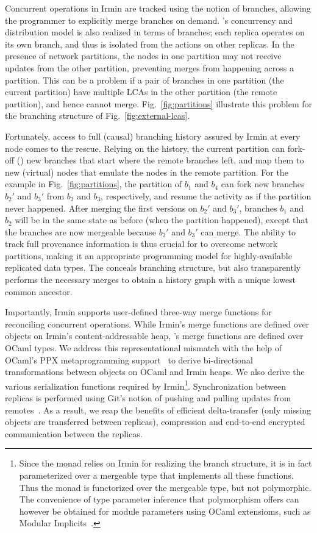 Concurrent operations in Irmin are tracked using the notion of
branches, allowing the programmer to explicitly merge branches on
demand. \name's concurrency and distribution model is also realized in
terms of branches; each replica operates on its own branch, and thus
is isolated from the actions on other replicas. In the presence of
network partitions, the nodes in one partition may not receive updates
from the other partition, preventing merges from happening across a
partition. This can be a problem if a pair of branches in one
partition (the current partition) have multiple LCAs in the other
partition (the remote partition), and hence cannot
merge. Fig.~\ref{fig:partitions} illustrate this problem for the
branching structure of Fig.~\ref{fig:external-lcas}.

Fortunately, access to full (causal) branching history assured by
Irmin at every node comes to the rescue. Relying on the history, the
current partition can fork-off () new branches that start
where the remote branches left, and map them to new (virtual) nodes
that emulate the nodes in the remote partition. For the example in
Fig.~\ref{fig:partitions}, the partition of $b_1$ and $b_4$ can fork
new branches $b_2'$ and $b_3'$ from $b_2$ and $b_3$, respectively, and
resume the activity as if the partition never happened. After merging
the first versions on $b_2'$ and $b_3'$, branches $b_1$ and $b_2$ will
be in the same state as before (when the partition happened), except
that the branches are now mergeable because $b_2'$ and $b_3'$ can
merge. The ability to track full provenance information is thus
crucial for \name to overcome network partitions, making it an
appropriate programming model for highly-available replicated data
types. The \nameMonad conceals branching structure, but also
transparently performs the necessary merges to obtain a history graph
with a unique lowest common ancestor.

Importantly, Irmin supports user-defined three-way merge functions for
reconciling concurrent operations. While Irmin's merge functions are
defined over objects on Irmin's content-addressable heap, \name's
merge functions are defined over OCaml types. We address this
representational mismatch with the help of OCaml's PPX metaprogramming
support~\cite{ppx} to derive bi-directional transformations between
objects on OCaml and Irmin heaps. We also derive the various
serialization functions required by Irmin\footnote{
  Since the \nameMonad monad relies on Irmin for realizing the branch
  structure, it is in fact parameterized over a mergeable type that
  implements all these functions. Thus the monad is functorized over
  the mergeable type, but not polymorphic. The convenience of type
  parameter inference that polymorphism offers can however be obtained
  for module parameters using OCaml extensioms, such as Modular
  Implicits~\cite{implicits}.
}.
Synchronization between replicas is performed using Git's notion of
pushing and pulling updates from remotes~\cite{git-tp}. As a result, we reap the
benefits of efficient delta-transfer (only missing objects are transferred between
replicas), compression and end-to-end encrypted communication between
the replicas.
